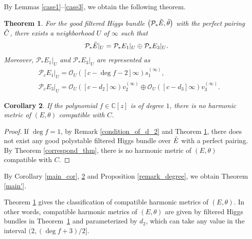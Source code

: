 \documentclass[10pt,a4paper]{amsart}
\numberwithin{equation}{section}
\newtheorem{Theorem}{Theorem}[section]
\newtheorem{Corollary}[Theorem]{Corollary}
\newcommand{\C}{\mathbb{C}}
\newcommand{\strsheaf}{\mathcal{O}}
\begin{document}
By Lemmas \ref{case1}--\ref{case3}, we obtain the following theorem.

\begin{Theorem}\label{classifying}
 For the good filtered Higgs bundle $\big(\mathcal{P}_*\Tilde{E},\Tilde{\theta}\big)$ with the perfect pairing $\Tilde{C}$, there exists a neighborhood $U$ of $\infty$ such that
 \begin{equation*}
 \mathcal{P}_*\Tilde{E}|_{U} = \mathcal{P}_*E_1|_{U} \oplus \mathcal{P}_*E_3|_{U}.
 \end{equation*}
 Moreover, $\mathcal{P}_*E_1|_{U}$ and $\mathcal{P}_*E_3|_{U}$ are represented as
 \begin{align*}
 & \mathcal{P}_{c}E_{1}|_{U} = \strsheaf_{U}([c -\deg{f}-2]\infty) s_1^{(\infty)}, \\
 & \mathcal{P}_{c}E_3|_{U} = \mathcal{O}_U([c-d_2]\infty)v^{(\infty)}_2 \oplus \mathcal{O}_U([c-d_3]\infty)v^{(\infty)}_3.
 \end{align*}
\end{Theorem}

\begin{Corollary}\label{sub_cor}
 If the polynomial $f\in \C[z]$ is of degree $1$, there is no harmonic metric of $(E,\theta)$ compatible with $C$.
\end{Corollary}
\begin{proof}
 If $\deg{f}=1$, by Remark \ref{condition_of_d_2} and Theorem \ref{classifying}, there does not exist any good polystable filtered Higgs bundle over $\Tilde{E}$ with a perfect pairing. By Theorem \ref{correspond_thm}, there is no harmonic metric of $(E,\theta)$ compatible with $C$.
\end{proof}

By Corollary \ref{main_cor}, \ref{sub_cor} and Proposition \ref{remark_degree}, we obtain Theorem \ref{main'}.
\begin{Remark}\label{rem_classifying}
 Theorem \ref{classifying} gives the classification of compatible harmonic metrics of $(E,\theta)$. In other words, compatible harmonic metrics of $(E,\theta)$ are given by filtered Higgs bundles in Theorem~\ref{classifying} and parameterized by $d_2$, which can take any value in the interval $(2,(\deg{f}+3)/2]$.
\end{Remark}
\end{document}
